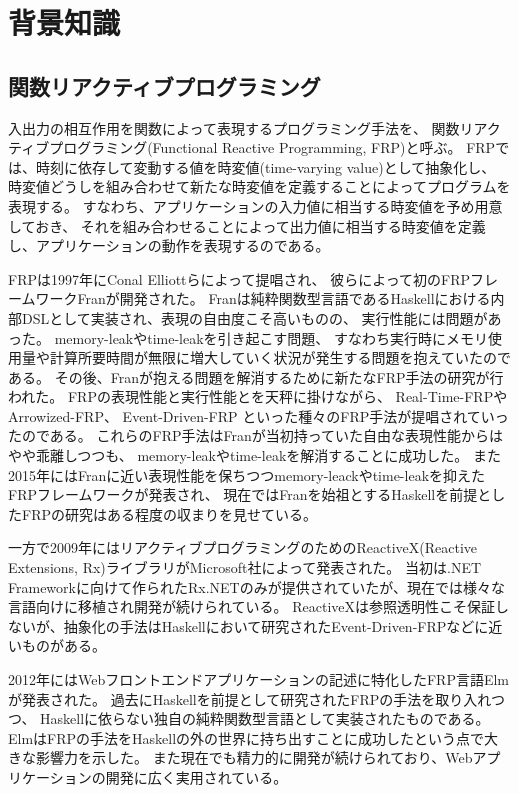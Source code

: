 \chapter{背景知識}
\section{関数リアクティブプログラミング}
入出力の相互作用を関数によって表現するプログラミング手法を、
関数リアクティブプログラミング(Functional Reactive Programming, FRP)と呼ぶ。
FRPでは、時刻に依存して変動する値を時変値(time-varying value)として抽象化し、
時変値どうしを組み合わせて新たな時変値を定義することによってプログラムを表現する。
すなわち、アプリケーションの入力値に相当する時変値を予め用意しておき、
それを組み合わせることによって出力値に相当する時変値を定義し、アプリケーションの動作を表現するのである。

FRPは1997年にConal Elliott\cite{elliott1997functional}らによって提唱され、
彼らによって初のFRPフレームワークFranが開発された。
Franは純粋関数型言語であるHaskellにおける内部DSLとして実装され、表現の自由度こそ高いものの、
実行性能には問題があった。
memory-leakやtime-leakを引き起こす問題、
すなわち実行時にメモリ使用量や計算所要時間が無限に増大していく状況が発生する問題を抱えていたのである。
その後、Franが抱える問題を解消するために新たなFRP手法の研究が行われた。
FRPの表現性能と実行性能とを天秤に掛けながら、
Real-Time-FRP\cite{wan2001real}やArrowized-FRP\cite{nilsson2002functional}、
Event-Driven-FRP\cite{simulinkwebsite}
といった種々のFRP手法が提唱されていったのである。
これらのFRP手法はFranが当初持っていた自由な表現性能からはやや乖離しつつも、
memory-leakやtime-leakを解消することに成功した。
また2015年にはFranに近い表現性能を保ちつつmemory-leackやtime-leakを抑えたFRPフレームワーク\cite{ploeg2015practical}が発表され、
現在ではFranを始祖とするHaskellを前提としたFRPの研究はある程度の収まりを見せている。

一方で2009年にはリアクティブプログラミングのためのReactiveX(Reactive Extensions, Rx)ライブラリがMicrosoft社によって発表された。
当初は.NET Frameworkに向けて作られたRx.NETのみが提供されていたが、現在では様々な言語向けに移植され開発が続けられている。
ReactiveXは参照透明性こそ保証しないが、抽象化の手法はHaskellにおいて研究されたEvent-Driven-FRPなどに近いものがある。

2012年にはWebフロントエンドアプリケーションの記述に特化したFRP言語Elm\cite{czaplicki2012elm,czaplicki2013asynchronous}
が発表された。
過去にHaskellを前提として研究されたFRPの手法を取り入れつつ、
Haskellに依らない独自の純粋関数型言語として実装されたものである。
ElmはFRPの手法をHaskellの外の世界に持ち出すことに成功したという点で大きな影響力を示した。
また現在でも精力的に開発が続けられており、Webアプリケーションの開発に広く実用されている。


